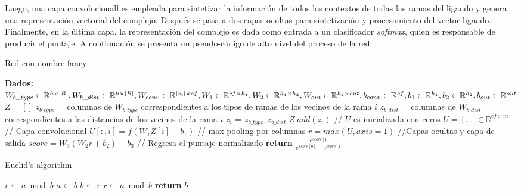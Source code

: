 Luego, una capa convolucionall es empleada para sintetizar la
información de todos los contextos de todas las ramas del ligando y
genera una representación vectorial del complejo. Después se pasa a
\sout{dos} capas ocultas para sintetización y procesamiento del
vector-ligando. Finalmente, en la última capa, la representación del
complejo es dada como entrada a un clasificador \textit{softmax},
quien es responsable de producir el puntaje. A continuación se
presenta un pseudo-código de alto nivel del proceso de la red:
\begin{algorithm}
  \caption{Red con nombre fancy}
  \begin{algorithmic}[1]
    \State \textbf{Dados:}\newline
                           $W_{b\_type} \in \mathbb{R}^{h\times |B|}, W_{b\_dist}
                           \in \mathbb{R}^{h\times |B|},\newline
                           W_{conv} \in \mathbb{R}^{|z_i| \times cf}, W_1 \in
                           \mathbb{R}^{cf \times h_1},\newline
                           W_2 \in \mathbb{R}^{h_1 \times h_2}, W_{out} \in
                           \mathbb{R}^{h_2 \times out},\newline
                           b_{conv} \in \mathbb{R}^{cf}, b_{1} \in
                           \mathbb{R}^{h_1},\newline
                           b_{2} \in \mathbb{R}^{h_2}, b_{out}
                           \in \mathbb{R}^{out}$
    \State $Z = []$
      \State $z_{b\_type}$ = columnas de $W_{b\_type}$
      correspondientes a los tipos de ramas de los vecinos de la
      rama $i$
      \State $z_{b\_dist}$ = columnas de $W_{b\_dist}$
      correspondientes a las distancias de los vecinos de la rama $i$
      \State $z_i$ = {$z_{b\_type}, z_{b\_dist}$}
      \State $Z.add(z_i)$
    \EndFor
    \State // $U$ es inicializada con ceros
    \State $U = [..] \in \mathbb{R}^{cf \times m}$
    \State // Capa convolucional
      \State $U[:,i]=f(W_1Z[i] + b_1)$
    \EndFor
    \State // max-pooling por columnas
    \State $r=max(U, axis=1)$
    \State //Capas ocultas y capa de salida
    \State $score=W_3(W_2r + b_2) + b_3$
    \State // Regresa el puntaje normalizado
    \State \textbf{return} $\frac{e^{score[1]}}{e^{score[0]}+e^{score[1]}}$
  \end{algorithmic}
\end{algorithm}

\begin{algorithm}
\caption{Euclid’s algorithm}\label{euclid}
\begin{algorithmic}[1]
\State $r\gets a\bmod b$
\State $a\gets b$
\State $b\gets r$
\State $r\gets a\bmod b$
\EndWhile\label{euclidendwhile}
\State \textbf{return} $b$
\EndProcedure
\end{algorithmic}
\end{algorithm}
